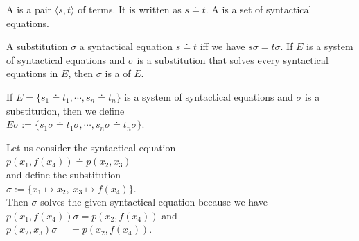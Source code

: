 \begin{Definition} 
  A   is a pair $\langle s, t \rangle$ of terms.
  It is written as $s \doteq t$. 
  A   is a set of syntactical
  equations.
  \eoxs
\end{Definition}


\begin{Definition}[Unifier]
  A substitution $\sigma$  a syntactical equation $s \doteq t$ iff we have $s\sigma = t\sigma$.
  If $E$ is a system of syntactical equations and $\sigma$ is a substitution that solves
  every syntactical equations in $E$, then $\sigma$ is a    of $E$.
  \eoxs
\end{Definition}

\noindent
If $E = \{ s_1 \doteq t_1, \cdots, s_n \doteq t_n \}$ is a system of syntactical equations and $\sigma$ is a
substitution, then we define
\\[0.2cm]
\hspace*{1.3cm}  $E\sigma := \{ s_1\sigma \doteq t_1\sigma, \cdots, s_n\sigma \doteq t_n\sigma \}$.
\vspace{0.3cm}

\example
Let us consider the syntactical equation
\\[0.2cm]
\hspace*{1.3cm}
$p(x_1, f(x_4)) \doteq p( x_2, x_3)$
\\[0.2cm]
and define the substitution
\\[0.2cm]
\hspace*{1.3cm}
$\sigma := \{ x_1 \mapsto x_2,\; x_3 \mapsto f(x_4) \}$.
\\[0.2cm]
Then $\sigma$ solves the given syntactical equation because we have
\\[0.2cm]
\hspace*{1.3cm}
$p(x_1, f(x_4))\sigma = p(x_2, f(x_4))$ \quad and \quad \\[0.2cm]
\hspace*{1.3cm}
$p(x_2, x_3)\sigma \;\quad = p(x_2, f(x_4))$.  \eox


